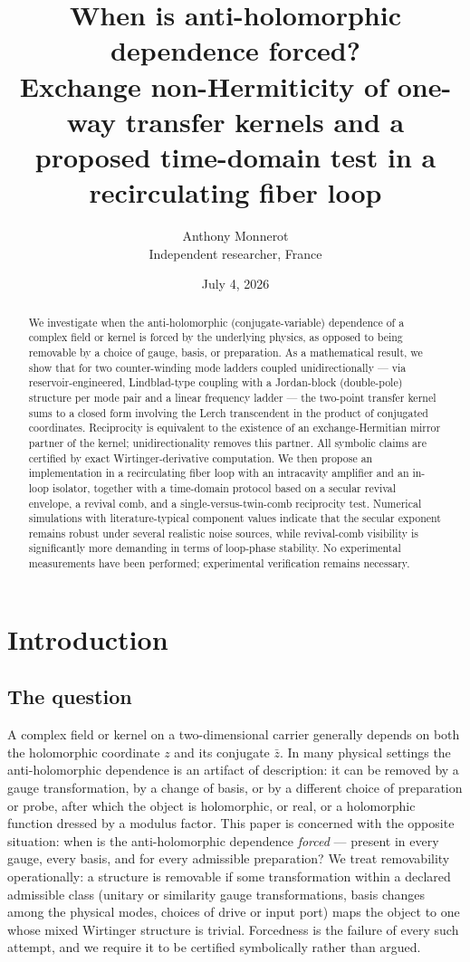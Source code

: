 \documentclass[11pt,a4paper]{article}
\title{\bfseries When is anti-holomorphic dependence forced?\\
Exchange non-Hermiticity of one-way transfer kernels and a proposed
time-domain test in a recirculating fiber loop}
\author{Anthony Monnerot\\ \small Independent researcher, France}
\date{July 4, 2026}
\newcommand{\zb}{\bar{z}}
\begin{document}
\maketitle

\begin{abstract}
\noindent
We investigate when the anti-holomorphic (conjugate-variable) dependence of a
complex field or kernel is forced by the underlying physics, as opposed to being
removable by a choice of gauge, basis, or preparation. As a mathematical result, we
show that for two counter-winding mode ladders coupled unidirectionally --- via
reservoir-engineered, Lindblad-type coupling with a Jordan-block (double-pole)
structure per mode pair and a linear frequency ladder --- the two-point transfer
kernel sums to a closed form involving the Lerch transcendent in the product of
conjugated coordinates. Reciprocity is equivalent to the existence of an
exchange-Hermitian mirror partner of the kernel; unidirectionality removes this
partner. All symbolic claims are certified by exact Wirtinger-derivative
computation. We then propose an implementation in a recirculating fiber loop with
an intracavity amplifier and an in-loop isolator, together with a time-domain
protocol based on a secular revival envelope, a revival comb, and a
single-versus-twin-comb reciprocity test. Numerical simulations with
literature-typical component values indicate that the secular exponent remains
robust under several realistic noise sources, while revival-comb visibility is
significantly more demanding in terms of loop-phase stability. No experimental
measurements have been performed; experimental verification remains necessary.
\end{abstract}

\section{Introduction}

\subsection{The question}

A complex field or kernel on a two-dimensional carrier generally depends on both
the holomorphic coordinate $z$ and its conjugate $\zb$. In many physical settings
the anti-holomorphic dependence is an artifact of description: it can be removed
by a gauge transformation, by a change of basis, or by a different choice of
preparation or probe, after which the object is holomorphic, or real, or a
holomorphic function dressed by a modulus factor. This paper is concerned with
the opposite situation: when is the anti-holomorphic dependence \emph{forced} ---
present in every gauge, every basis, and for every admissible preparation? We treat
removability operationally: a structure is removable if some transformation
within a declared admissible class (unitary or similarity gauge
transformations, basis changes among the physical modes, choices of drive or
input port) maps the object to one whose mixed Wirtinger structure is trivial.
Forcedness is the failure of every such attempt, and we require it to be
certified symbolically rather than argued.
\end{document}
